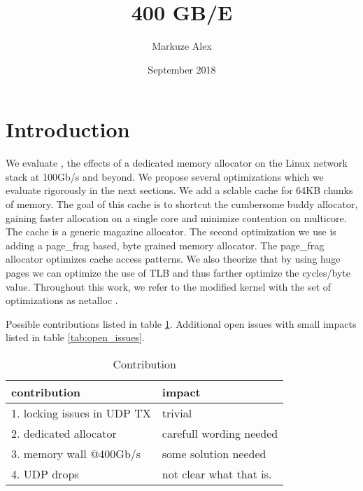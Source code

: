 \documentclass[sigplan,10pt]{acmart}
\title{400 GB/E}
\author{Markuze Alex}
\date{September 2018}
\newcommand{\oursys}{netalloc }
\begin{document}
\maketitle
\section{Introduction}
We evaluate , the effects of a dedicated memory allocator on the Linux network stack at 100Gb/s and beyond.
We propose several optimizations which we evaluate rigorously in the next sections. We add a sclable cache for 64KB chunks of memory. The goal of this cache is to shortcut the cumbersome buddy allocator, gaining faster allocation on a single core and minimize contention on multicore. The cache is a generic magazine allocator.
The second optimization we use is adding a page\_frag based, byte grained memory allocator. The page\_frag allocator optimizes cache access patterns.
We also theorize that by using huge pages we can optimize the use of TLB and thus farther optimize the cycles/byte value.
Throughout this work, we refer to the modified kernel with the set of optimizations as \oursys.

Possible contributions listed in table \ref{tab:contributions}.
Additional open issues with small impacts listed in table \ref{tab:open_issues}.
\begin{table}[h]
\centering
\begin{tabular}{l|l}
contribution & impact \\\hline
1. locking issues in UDP TX & trivial\\
2. dedicated allocator & carefull wording needed\\
3. memory wall @400Gb/s & some solution needed\\
4. UDP drops & not clear what that is.\\
\hline
\end{tabular}
\caption{\label{tab:contributions}Contribution}
\end{table}

\newpage




\renewcommand\footnotetextcopyrightpermission[1]{}
\end{document}
